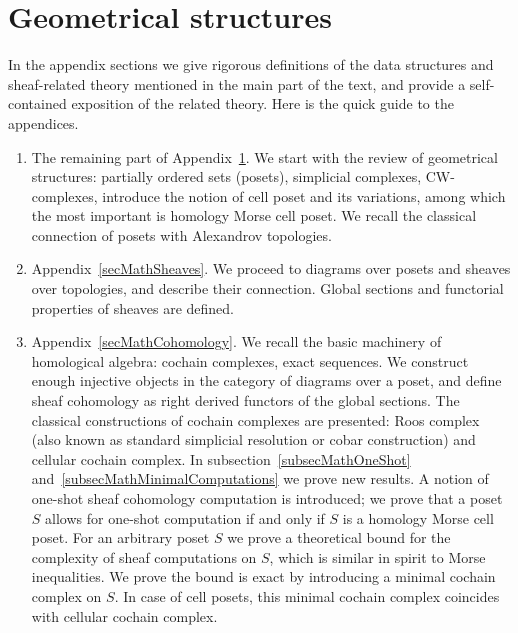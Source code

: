 
\section{Geometrical structures} \label{secMathStructures}

In the appendix sections we give rigorous definitions of the data structures and sheaf-related theory mentioned in the main part of the text, and provide a self-contained exposition of the related theory. Here is the quick guide to the appendices.
\begin{enumerate}
  \item The remaining part of Appendix~\ref{secMathStructures}. We start with the review of geometrical structures: partially ordered sets (posets), simplicial complexes, CW-complexes, introduce the notion of cell poset and its variations, among which the most important is homology Morse cell poset. We recall the classical connection of posets with Alexandrov topologies.
  \item Appendix~\ref{secMathSheaves}. We proceed to diagrams over posets and sheaves over topologies, and describe their connection. Global sections and functorial properties of sheaves are defined.
  \item Appendix~\ref{secMathCohomology}. We recall the basic machinery of homological algebra: cochain complexes, exact sequences. We construct enough injective objects in the category of diagrams over a poset, and define sheaf cohomology as right derived functors of the global sections. The classical constructions of cochain complexes are presented: Roos complex (also known as standard simplicial resolution or cobar construction) and cellular cochain complex. In subsection~\ref{subsecMathOneShot} and~\ref{subsecMathMinimalComputations} we prove new results. A notion of one-shot sheaf cohomology computation is introduced; we prove that a poset $S$ allows for one-shot computation if and only if $S$ is a homology Morse cell poset. For an arbitrary poset $S$ we prove a theoretical bound for the complexity of sheaf computations on $S$, which is similar in spirit to Morse inequalities. We prove the bound is exact by introducing a minimal cochain complex on $S$. In case of cell posets, this minimal cochain complex coincides with cellular cochain complex.

\end{enumerate}
